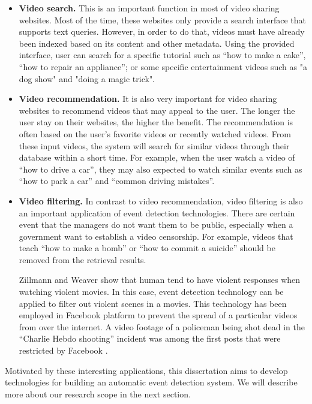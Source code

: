 \begin{itemize}
	\item \textbf{Video search.} This is an important function in most of video sharing websites. Most of the time, these websites only provide a search interface that supports text queries. However, in order to do that, videos must have already been indexed based on its content and other metadata. Using the provided interface, user can search for a specific tutorial such as ``how to make a cake'',  ``how to repair an appliance''; or some specific entertainment videos such as "a dog show" and "doing a magic trick".
	\item \textbf{Video recommendation.} It is also very important for video sharing websites to recommend videos that may appeal to the user. The longer the user stay on their websites, the higher the benefit. The recommendation is often based on the user's favorite videos or recently watched videos. From these input videos, the system will search for similar videos through their database within a short time. For example, when the user watch a video of ``how to drive a car'', they may also expected to watch similar events such as ``how to park a car'' and ``common driving mistakes''.
	\item \textbf{Video filtering.} In contrast to video recommendation, video filtering is also an important application of event detection technologies. There are certain event that the managers do not want them to be public, especially when a government want to establish a video censorship. For example, videos that teach ``how to make a bomb'' or ``how to commit a suicide'' should be removed from the retrieval results. 

	Zillmann and Weaver \cite{JASP:JASP145} show that human tend to have violent responses when watching violent movies. In this case, event detection technology can be applied to filter out violent scenes  in a movies. This technology has been employed in Facebook platform \cite{Internet3} to prevent the spread of a particular videos from over the internet. A video footage of a policeman being shot dead in the ``Charlie Hebdo shooting'' incident was among the first posts that were restricted by Facebook \cite{Internet3}. 
	
\end{itemize}

Motivated by these interesting applications, this dissertation aims to develop technologies for building an automatic event detection system. We will describe more about our research scope in the next section.

